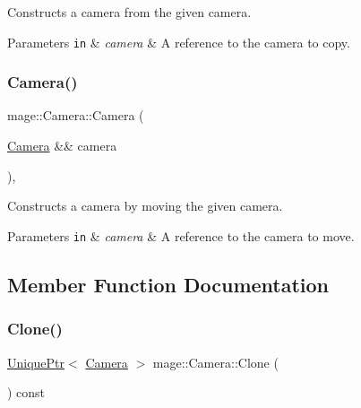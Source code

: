 Constructs a camera from the given camera.


\begin{DoxyParams}[1]{Parameters}
\mbox{\tt in}  & {\em camera} & A reference to the camera to copy. \\
\hline
\end{DoxyParams}
\hypertarget{classmage_1_1_camera_a4dc6f31c108b28abe9580ef6d7a06713}{}\label{classmage_1_1_camera_a4dc6f31c108b28abe9580ef6d7a06713} 
\subsubsection{\texorpdfstring{Camera()}{Camera()}\hspace{0.1cm}{\footnotesize\ttfamily [3/3]}}
{\footnotesize\ttfamily mage\+::\+Camera\+::\+Camera (\begin{DoxyParamCaption}\item[{\hyperlink{classmage_1_1_camera}{Camera} \&\&}]{camera }\end{DoxyParamCaption})\hspace{0.3cm}{\ttfamily [protected]}, {\ttfamily [default]}}

Constructs a camera by moving the given camera.


\begin{DoxyParams}[1]{Parameters}
\mbox{\tt in}  & {\em camera} & A reference to the camera to move. \\
\hline
\end{DoxyParams}


\subsection{Member Function Documentation}
\hypertarget{classmage_1_1_camera_a830e9a071449f1026fd43fcd19577e6c}{}\label{classmage_1_1_camera_a830e9a071449f1026fd43fcd19577e6c} 
\subsubsection{\texorpdfstring{Clone()}{Clone()}}
{\footnotesize\ttfamily \hyperlink{namespacemage_a3316d7143a973e37adf1110f2e80ca31}{Unique\+Ptr}$<$ \hyperlink{classmage_1_1_camera}{Camera} $>$ mage\+::\+Camera\+::\+Clone (\begin{DoxyParamCaption}{ }\end{DoxyParamCaption}) const}

